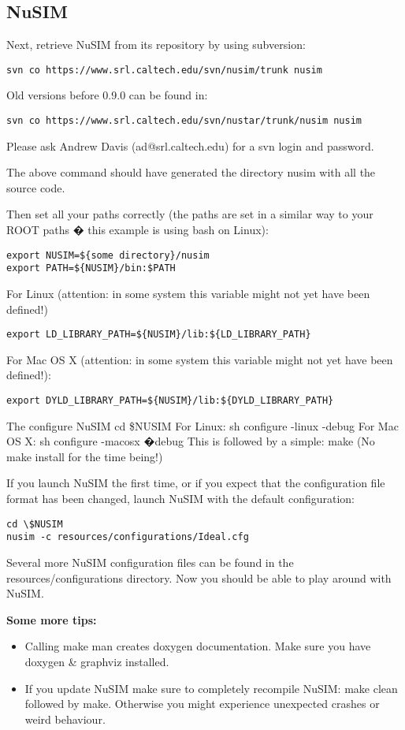 \subsection{NuSIM}
Next, retrieve NuSIM from its repository by using subversion:
\begin{verbatim}
svn co https://www.srl.caltech.edu/svn/nusim/trunk nusim
\end{verbatim}
Old versions before 0.9.0 can be found in:
\begin{verbatim}
svn co https://www.srl.caltech.edu/svn/nustar/trunk/nusim nusim
\end{verbatim}
Please ask Andrew Davis (ad@srl.caltech.edu) for a svn login and password.

The above command should have generated the directory nusim with all the source code.

Then set all your paths correctly (the paths are set in a similar way to your ROOT paths � this example is using bash on Linux):
\begin{verbatim}
export NUSIM=${some directory}/nusim
export PATH=${NUSIM}/bin:$PATH
\end{verbatim}
For Linux (attention: in some system this variable might not yet have been defined!)
\begin{verbatim}
export LD_LIBRARY_PATH=${NUSIM}/lib:${LD_LIBRARY_PATH}
\end{verbatim}
For Mac OS X (attention: in some system this variable might not yet have been defined!):
\begin{verbatim}
export DYLD_LIBRARY_PATH=${NUSIM}/lib:${DYLD_LIBRARY_PATH}
\end{verbatim}

The configure NuSIM 
cd \$NUSIM
For Linux:
sh configure -linux -debug
For Mac OS X:
sh configure -macosx �debug
This is followed by a simple:
make
(No make install for the time being!)

If you launch NuSIM the first time, or if you expect that the configuration file format has been changed, launch NuSIM with the default configuration:

\begin{verbatim}
cd \$NUSIM
nusim -c resources/configurations/Ideal.cfg
\end{verbatim}

Several more NuSIM configuration files can be found in the resources/configurations directory. Now you should be able to play around with NuSIM.

\textbf{Some more tips:}
\begin{itemize}
\item Calling make man creates doxygen documentation. Make sure you have doxygen \& graphviz installed.
\item If you update NuSIM make sure to completely recompile NuSIM: make clean followed by make. Otherwise you might experience unexpected crashes or weird behaviour. 
\end{itemize}

